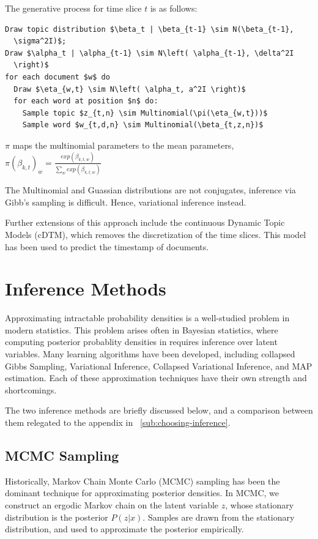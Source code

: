 \documentclass[letterpaper]{article}
\begin{document}
The generative process for time slice $t$ is as follows:

\begin{lstlisting}[mathescape=true]
Draw topic distribution $\beta_t | \beta_{t-1} \sim N(\beta_{t-1},
  \sigma^2I)$;
Draw $\alpha_t | \alpha_{t-1} \sim N\left( \alpha_{t-1}, \delta^2I
  \right)$
for each document $w$ do
  Draw $\eta_{w,t} \sim N\left( \alpha_t, a^2I \right)$
  for each word at position $n$ do:
    Sample topic $z_{t,n} \sim Multinomial(\pi(\eta_{w,t}))$
    Sample word $w_{t,d,n} \sim Multinomial(\beta_{t,z,n})$
\end{lstlisting}

$\pi$ maps the multinomial parameters to the mean parameters,
$\pi\left( \beta_{k,t} \right)_w = \frac{exp(\beta_{k,t,w})}{\sum_w exp\left( \beta_{k,t,w} \right)}$

The Multinomial and Guassian distributions are not conjugates,
inference via Gibb's sampling is difficult. Hence, variational
inference instead.

Further extensions of this approach include the continuous Dynamic
Topic Models (cDTM), which removes the discretization of the time
slices. \citep{wang-2012-contin-time} This model has been used to
predict the timestamp of documents.

\section{Inference Methods}
\label{sec:inference}
Approximating intractable probability densities is a well-studied
problem in modern statistics. This problem arises often in Bayesian
statistics, where computing posterior probablity densities in requires
inference over latent variables. Many learning algorithms have been
developed, including collapsed Gibbs Sampling, Variational Inference,
Collapsed Variational Inference, and MAP estimation. Each of these
approximation techniques have their own strength and shortcomings.

The two inference methods are briefly discussed below, and a
comparison between them relegated to the appendix in
~\autoref{sub:choosing-inference}.

\subsection{MCMC Sampling}
\label{subsec:mcmc-sampling}
Historically, Markov Chain Monte Carlo (MCMC) sampling has been the
dominant technique for approximating posterior densities. In MCMC, we
construct an ergodic Markov chain on the latent variable $z$,
whose stationary distribution is the posterior $P( z | x)$.
Samples are drawn from the stationary distribution, and used to
approximate the posterior empirically.
\end{document}
